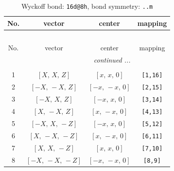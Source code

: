 \documentclass[fleqn,8pt]{jsarticle}
\begin{document}
\begin{longtable}{cccc}
\caption{Wyckoff bond: {\tt 16d@8h}, bond symmetry: {\tt ..m}}
 \\
 \hline \hline
No. & vector & center & mapping \\ \hline \endfirsthead

\multicolumn{3}{l}{\tablename\ \thetable{}} \\
 \hline \hline
No. & vector & center & mapping \\ \hline \endhead

 \hline \hline
\multicolumn{3}{r}{\footnotesize\it continued ...} \\ \endfoot

 \hline \hline
\multicolumn{3}{r}{} \\ \endlastfoot

1 & $\left[ X,\, X,\, Z \right]$ & $\left[ x,\, x,\, 0 \right]$ & {\tt [1,16]} \\ \hline
2 & $\left[ - X,\, - X,\, Z \right]$ & $\left[ - x,\, - x,\, 0 \right]$ & {\tt [2,15]} \\ \hline
3 & $\left[ - X,\, X,\, Z \right]$ & $\left[ - x,\, x,\, 0 \right]$ & {\tt [3,14]} \\ \hline
4 & $\left[ X,\, - X,\, Z \right]$ & $\left[ x,\, - x,\, 0 \right]$ & {\tt [4,13]} \\ \hline
5 & $\left[ - X,\, X,\, - Z \right]$ & $\left[ - x,\, x,\, 0 \right]$ & {\tt [5,12]} \\ \hline
6 & $\left[ X,\, - X,\, - Z \right]$ & $\left[ x,\, - x,\, 0 \right]$ & {\tt [6,11]} \\ \hline
7 & $\left[ X,\, X,\, - Z \right]$ & $\left[ x,\, x,\, 0 \right]$ & {\tt [7,10]} \\ \hline
8 & $\left[ - X,\, - X,\, - Z \right]$ & $\left[ - x,\, - x,\, 0 \right]$ & {\tt [8,9]} \\
\end{longtable}
\renewcommand{\arraystretch}{1.2}
\end{document}
